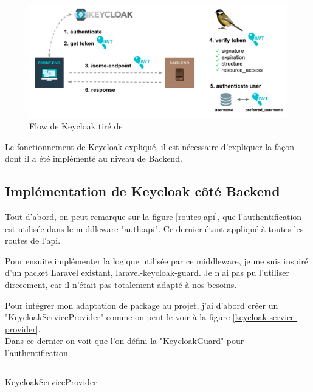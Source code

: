 \documentclass[
    iai, %
    il, %
]{heig-tb}
\begin{document}

\begin{center}
    \begin{figure}
        \includegraphics[width=\textwidth]{./assets/figures/keycloak-flow.png}
        \caption{Flow de Keycloak tiré de \href{https://github.com/robsontenorio/laravel-keycloak-guard} \label{keycloak-flow-lib}}
    \end{figure}
\end{center}


Le fonctionnement de Keycloak expliqué, il est nécessaire d'expliquer la façon dont il a été implémenté au niveau de Backend.

\subsection{Implémentation de Keycloak côté Backend}
Tout d'abord, on peut remarque sur la figure \ref{routes-api}, que l'authentification est utilisée dans le middleware "auth:api". Ce dernier étant appliqué à toutes les routes de l'\Gls{api}.

Pour ensuite implémenter la logique utilisée par ce middleware, je me suis inspiré d'un packet Laravel existant, \href{https://github.com/robsontenorio/laravel-keycloak-guard}{laravel-keycloak-guard}. Je n'ai pas pu l'utiliser direcement, car il n'était pas totalement adapté à nos besoins.

Pour intégrer mon adaptation de package au projet, j'ai d'abord créer un "KeycloakServiceProvider" comme on peut le voir à la figure \ref{keycloak-service-provider}. \\
Dans ce dernier on voit que l'on défini la "KeycloakGuard" pour l'authentification.

\begin{listing}[h]
    \inputminted{php}{assets/code/KeycloakServiceProvider.php}
    \caption{KeycloakServiceProvider \label{keycloak-service-provider}}
\end{listing}
\end{document}
